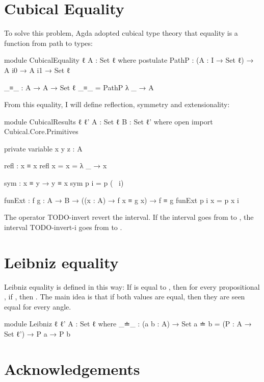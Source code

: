 \documentclass{article}
\begin{document}
\section{Cubical Equality}

To solve this problem, Agda adopted cubical type theory that equality is a function from path to types:

\begin{code}
module CubicalEquality {ℓ} {A : Set ℓ} where
  postulate
    PathP : (A : I → Set ℓ) → A i0 → A i1 → Set ℓ

  _≡_ : A → A → Set ℓ
  _≡_ = PathP λ _ → A
\end{code}

From this equality, I will define reflection, symmetry and extensionality:

\begin{code}
module CubicalResults {ℓ ℓ'} {A : Set ℓ} {B : Set ℓ'} where
  open import Cubical.Core.Primitives

  private variable
    x y z : A

  refl : x ≡ x
  refl {x = x} = λ _ → x

  sym : x ≡ y → y ≡ x
  sym p i = p (~ i)

  funExt : {f g : A → B}
    → ((x : A) → f x ≡ g x) → f ≡ g
  funExt p i x = p x i
\end{code}

The operator TODO-invert revert the interval. If the interval  goes from
 to , the interval TODO-invert-i goes from  to .

\section{Leibniz equality}

Leibniz equality is defined in this way:
If  is equal to , then for every propositional , if ,
then .
The main idea is that if both values are equal, then they are seen equal for every angle.

\begin{code}
module Leibniz {ℓ} {ℓ'} {A : Set ℓ} where
  _≐_ : (a b : A) → Set
  a ≐ b = (P : A → Set ℓ') → P a → P b
\end{code}





\section*{Acknowledgements}



\end{document}
